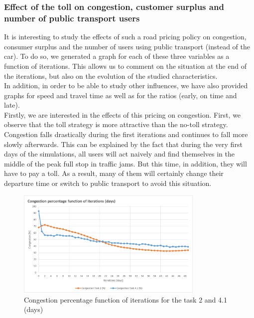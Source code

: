 \documentclass[a4paper, 12pt,oneside]{article}
\begin{document}
\subsubsection{Effect of the toll on congestion, customer surplus and number of public transport users}
It is interesting to study the effects of such a road pricing policy on congestion, consumer surplus and the number of users using public transport (instead of the car). To do so, we generated a graph for each of these three variables as a function of iterations. This allows us to comment on the situation at the end of the iterations, but also on the evolution of the studied characteristics.\\

In addition, in order to be able to study other influences, we have also provided graphs for speed and travel time as well as for the ratios (early, on time and late).\\

Firstly, we are interested in the effects of this pricing on congestion. First, we observe that the toll strategy is more attractive than the no-toll strategy. Congestion falls drastically during the first iterations and continues to fall more slowly afterwards. This can be explained by the fact that during the very first days of the simulations, all users will act naively and find themselves in the middle of the peak full stop in traffic jams. But this time, in addition, they will have to pay a toll. As a result, many of them will certainly change their departure time or switch to public transport to avoid this situation.\\

\begin{figure}[H]
    \centering
    \includegraphics[width=0.8\textwidth]{Images/Step4/Congestion_percentage_function_iterations_comparaison_task_2_4.1.png}
    \caption{Congestion percentage function of iterations for the task 2 and 4.1 (days)}
    \label{fig:Congestion percentage function of iterations for the task 2 and 4.1 (days)}
\end{figure}
\end{document}
